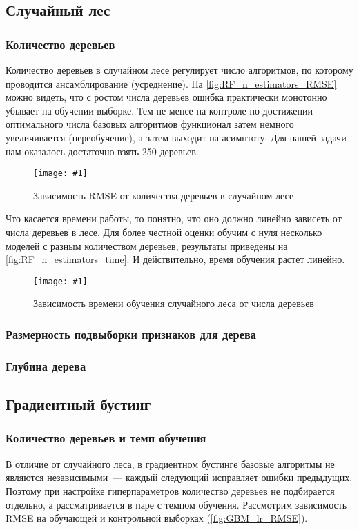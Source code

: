 \documentclass[12pt]{article}
\newcommand{\mpl}[2]{
    \begin{figure}[!h]
        \texttt{[image: \#1]}
        \centering
        \caption{#2}
        \label{fig:#1}
     \end{figure}
}
\begin{document}
\subsection{Случайный лес}
\subsubsection{Количество деревьев}
Количество деревьев в случайном лесе регулирует число алгоритмов, по которому проводится ансамблирование (усреднение). На \autoref{fig:RF_n_estimators_RMSE} можно видеть, что с ростом числа деревьев ошибка практически монотонно убывает на обучении выборке. Тем не менее на контроле по достижении оптимального числа базовых алгоритмов функционал затем немного увеличивается (переобучение), а затем выходит на асимптоту. Для нашей задачи нам оказалось достаточно взять 250 деревьев.

\mpl{RF_n_estimators_RMSE}{Зависимость RMSE от количества деревьев в случайном лесе}

Что касается времени работы, то понятно, что оно должно линейно зависеть от числа деревьев в лесе. Для более честной оценки обучим с нуля несколько моделей с разным количеством деревьев, результаты приведены на \autoref{fig:RF_n_estimators_time}. И действительно, время обучения растет линейно.
\mpl{RF_n_estimators_time}{Зависимость времени обучения случайного леса от числа деревьев}

\subsubsection{Размерность подвыборки признаков для дерева}
\subsubsection{Глубина дерева}

\subsection{Градиентный бустинг}
\subsubsection{Количество деревьев и темп обучения}
В отличие от случайного леса, в градиентном бустинге базовые алгоритмы не являются независимыми~--- каждый следующий исправляет ошибки предыдущих. Поэтому при настройке гиперпараметров количество деревьев не подбирается отдельно, а рассматривается в паре с темпом обучения. Рассмотрим зависимость RMSE на обучающей и контрольной выборках (\autoref{fig:GBM_lr_RMSE}).
\end{document}
